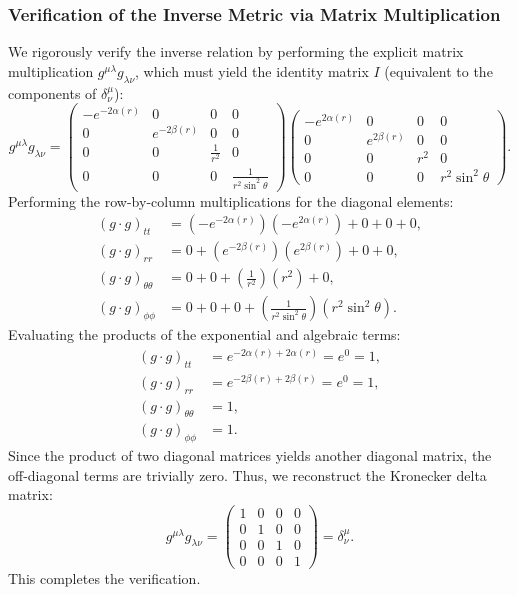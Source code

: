 \documentclass[11pt, a4paper]{report}
\begin{document}
\subsubsection{Verification of the Inverse Metric via Matrix Multiplication}
We rigorously verify the inverse relation by performing the explicit matrix multiplication $g^{\mu\lambda} g_{\lambda\nu}$, which must yield the identity matrix $I$ (equivalent to the components of $\delta^\mu_\nu$):
\begin{equation}
g^{\mu\lambda} g_{\lambda\nu} = \begin{pmatrix}
-e^{-2\alpha(r)} & 0 & 0 & 0 \\
0 & e^{-2\beta(r)} & 0 & 0 \\
0 & 0 & \frac{1}{r^2} & 0 \\
0 & 0 & 0 & \frac{1}{r^2 \sin^2\theta}
\end{pmatrix}
\begin{pmatrix}
-e^{2\alpha(r)} & 0 & 0 & 0 \\
0 & e^{2\beta(r)} & 0 & 0 \\
0 & 0 & r^2 & 0 \\
0 & 0 & 0 & r^2 \sin^2\theta
\end{pmatrix}.
\end{equation}
Performing the row-by-column multiplications for the diagonal elements:
\begin{align}
(g \cdot g)_{tt} &= \left(-e^{-2\alpha(r)}\right)\left(-e^{2\alpha(r)}\right) + 0 + 0 + 0, \\
(g \cdot g)_{rr} &= 0 + \left(e^{-2\beta(r)}\right)\left(e^{2\beta(r)}\right) + 0 + 0, \\
(g \cdot g)_{\theta\theta} &= 0 + 0 + \left(\frac{1}{r^2}\right)\left(r^2\right) + 0, \\
(g \cdot g)_{\phi\phi} &= 0 + 0 + 0 + \left(\frac{1}{r^2 \sin^2\theta}\right)\left(r^2 \sin^2\theta\right).
\end{align}
Evaluating the products of the exponential and algebraic terms:
\begin{align}
(g \cdot g)_{tt} &= e^{-2\alpha(r) + 2\alpha(r)} = e^0 = 1, \\
(g \cdot g)_{rr} &= e^{-2\beta(r) + 2\beta(r)} = e^0 = 1, \\
(g \cdot g)_{\theta\theta} &= 1, \\
(g \cdot g)_{\phi\phi} &= 1.
\end{align}
Since the product of two diagonal matrices yields another diagonal matrix, the off-diagonal terms are trivially zero. Thus, we reconstruct the Kronecker delta matrix:
\begin{equation}
g^{\mu\lambda} g_{\lambda\nu} = \begin{pmatrix}
1 & 0 & 0 & 0 \\
0 & 1 & 0 & 0 \\
0 & 0 & 1 & 0 \\
0 & 0 & 0 & 1
\end{pmatrix} = \delta^\mu_\nu.
\end{equation}
This completes the verification.
\end{document}
